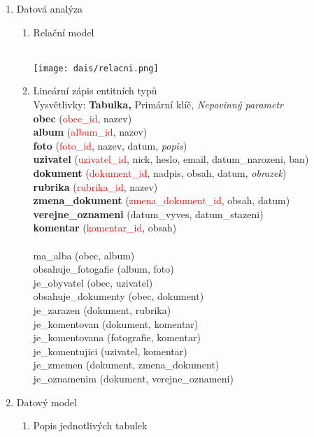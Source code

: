 \documentclass[12pt]{article}
\begin{document}
\begin{enumerate}
	\item Datová analýza
		\begin{enumerate}[label*=\arabic*.]
			\item Relační model \\ \\
			\begin{center}
				\texttt{[image: dais/relacni.png]}
			\end{center}
			\item Lineární zápis entitních typů \\
				Vysvětlivky: \textbf{Tabulka,} \color{red} Primární klíč\color{black},   \textit{Nepovinný parametr}\\ 
				
				\textbf{obec} (\textcolor{red}{obec\_id}, nazev)\\
				\textbf{album} (\textcolor{red}{album\_id}, nazev)\\
				\textbf{foto} (\textcolor{red}{foto\_id}, nazev, datum, \textit{popis})\\
				\textbf{uzivatel} (\textcolor{red}{uzivatel\_id}, nick, heslo, email, datum\_narozeni, ban)\\
				\textbf{dokument} (\textcolor{red}{dokument\_id}, nadpis, obsah, datum, \textit{obrazek})\\
				\textbf{rubrika} (\textcolor{red}{rubrika\_id}, nazev)\\
				\textbf{zmena\_dokument} (\textcolor{red}{zmena\_dokument\_id}, obsah, datum)\\
				\textbf{verejne\_oznameni} (datum\_vyves, datum\_stazeni)\\
				\textbf{komentar} (\textcolor{red}{komentar\_id}, obsah)\\ \\
				ma\_alba (obec, album)\\
				obsahuje\_fotogafie (album, foto)\\
				je\_obyvatel (obec, uzivatel)\\
				obsahuje\_dokumenty (obec, dokument)\\
				je\_zarazen (dokument, rubrika)\\
				je\_komentovan (dokument, komentar)\\
				je\_komentovana (fotografie, komentar)\\
				je\_komentujici (uzivatel, komentar)\\
				je\_zmemen (dokument, zmena\_dokument)\\
				je\_oznamenim (dokument, verejne\_oznameni)\\
		\end{enumerate} %
		\newpage
		\item Datový model
		\begin{enumerate}[label*=\arabic*.]
			\item Popis jednotlivých tabulek\\
			

\end{enumerate}
\end{enumerate}
\end{document}
